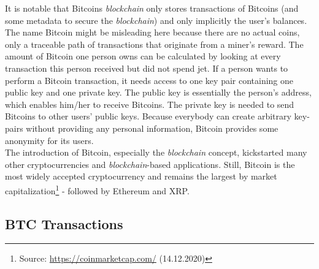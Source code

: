 \documentclass{cacthesis}
\begin{document}
        It is notable that Bitcoins \textit{blockchain} only stores transactions of Bitcoins (and some metadata to secure the \textit{blockchain}) and only implicitly the user's balances. The name Bitcoin might be misleading here because there are no actual coins, only a traceable path of transactions that originate from a miner's reward. The amount of Bitcoin one person owns can be calculated by looking at every transaction this person received but did not spend jet. If a person wants to perform a Bitcoin transaction, it needs access to one key pair containing one public key and one private key. The public key is essentially the person's address, which enables him/her to receive Bitcoins. The private key is needed to send Bitcoins to other users' public keys. Because everybody can create arbitrary key-pairs without providing any personal information, Bitcoin provides some anonymity for its users. \\
        The introduction of Bitcoin, especially the \textit{blockchain} concept, kickstarted many other cryptocurrencies and \textit{blockchain}-based applications. Still, Bitcoin is the most widely accepted cryptocurrency and remains the largest by market capitalization\footnote{Source: \url{https://coinmarketcap.com/} (14.12.2020)} - followed by Ethereum and XRP.

        \subsection{BTC Transactions}
        \label{sub:BTCTx}
        
\end{document}
